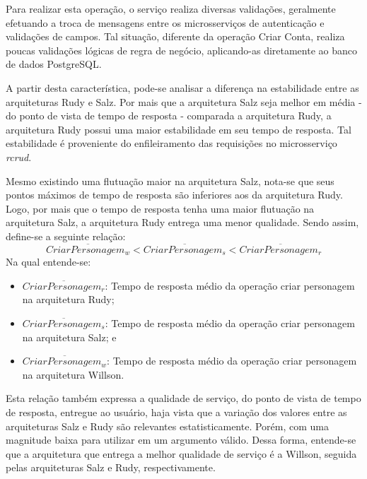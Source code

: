 Para realizar esta operação, o serviço realiza diversas validações, geralmente efetuando a troca de mensagens entre os microsserviços de autenticação e validações de campos.
%
Tal situação, diferente da operação Criar Conta, realiza poucas validações lógicas de regra de negócio, aplicando-as diretamente ao banco de dados PostgreSQL.

A partir desta característica, pode-se analisar a diferença na estabilidade entre as arquiteturas Rudy e Salz.
%
Por mais que a arquitetura Salz seja melhor em média - do ponto de vista de tempo de resposta - comparada a arquitetura Rudy, a arquitetura Rudy possui uma maior estabilidade em seu tempo de resposta.
%
Tal estabilidade é proveniente do enfileiramento das requisições no microsserviço \textit{rcrud}.

Mesmo existindo uma flutuação maior na arquitetura Salz, nota-se que seus pontos máximos de tempo de resposta são inferiores aos da arquitetura Rudy.
%
Logo, por mais que o tempo de resposta tenha uma maior flutuação na arquitetura Salz, a arquitetura Rudy entrega uma menor qualidade.
%
Sendo assim, define-se a seguinte relação:
\vspace{-0.3cm}
$$
  \overline{CriarPersonagem_{w}} < \overline{CriarPersonagem_{s}} <\overline{CriarPersonagem_{r}}
$$
\vspace{-0.3cm}
Na qual entende-se:
\vspace{-0.3cm}
\begin{itemize}
 \item $\overline{CriarPersonagem_{r}}$: Tempo de resposta médio da operação criar personagem na arquitetura Rudy;
 \item $\overline{CriarPersonagem_{s}}$: Tempo de resposta médio da operação criar personagem na arquitetura Salz; e
 \item $\overline{CriarPersonagem_{w}}$: Tempo de resposta médio da operação criar personagem na arquitetura Willson.
\end{itemize}

Esta relação também expressa a qualidade de serviço, do ponto de vista de tempo de resposta, entregue ao usuário, haja vista que a variação dos valores entre as arquiteturas Salz e Rudy são relevantes estatisticamente.
%
Porém, com uma magnitude baixa para utilizar em um argumento válido.
%
Dessa forma, entende-se que a arquitetura que entrega a melhor qualidade de serviço é a Willson, seguida pelas arquiteturas Salz e Rudy, respectivamente.



